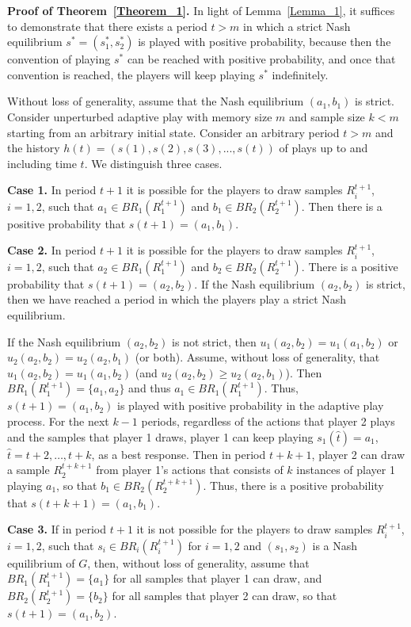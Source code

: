 \textbf{Proof of Theorem~\ref{Theorem_1}.}
In light of Lemma~\ref{Lemma_1}, it suffices to demonstrate that there exists a period $t > m$ in which a strict Nash equilibrium $s^*=(s_1^*,s_2^*)$ is played with positive probability, because then the convention of playing $s^*$ can be reached with positive probability, and once that convention is reached, the players will keep playing $s^*$ indefinitely.

Without loss of generality, assume that the Nash equilibrium $(a_1,b_1)$ is strict. 
%
Consider unperturbed adaptive play with memory size $m$ and sample size $k < m$ starting from an arbitrary initial state. Consider an arbitrary period $t>m$ and the history $h(t) = (s(1), s(2), s(3), ..., s(t))$ of plays up to and including time $t$. 
%
We distinguish three cases.

{\bf Case 1. } In period $t+1$ it is possible for the players to draw samples $R_i^{t+1}$, $i=1,2$, such that $a_1\in BR_1(R_1^{t+1})$ and $b_1\in BR_2(R_2^{t+1})$. Then there is a positive probability that $s(t+1)=(a_1,b_1)$. 

{\bf Case 2. } In period $t+1$ it is possible for the players to draw samples $R_i^{t+1}$, $i=1,2$, such that $a_2\in BR_1(R_1^{t+1})$ and $b_2\in BR_2(R_2^{t+1})$. There is a positive probability that $s(t+1)=(a_2,b_2)$. If the Nash equilibrium $(a_2,b_2)$ is strict, then we have reached a period in which the players play a strict Nash equilibrium.  
%

If the Nash equilibrium $(a_2,b_2)$ is not strict, then $u_1(a_2,b_2) = u_1(a_1,b_2)$ or $u_2(a_2,b_2) = u_2(a_2,b_1)$ (or both). Assume, without loss of generality, that $u_1(a_2,b_2) = u_1(a_1,b_2)$ (and $u_2(a_2,b_2) \geq u_2(a_2,b_1)$). Then $BR_1(R_1^{t+1})=\{a_1,a_2\}$ and thus $a_1\in BR_1(R_1^{t+1})$. Thus, $s(t+1)=(a_1,b_2)$ is played with positive probability in the adaptive play process. For the next $k-1$ periods, regardless of the actions that player 2 plays and the samples that player 1 draws, player 1 can keep playing $s_1(\hat{t})=a_1$, $\hat{t}=t+2, \ldots, t+k$, as a best response. Then in period $t+k+1$, player 2 can draw a sample $R_2^{t+k+1}$ from player 1's actions that consists of $k$ instances of player 1 playing $a_1$, so that $b_1\in BR_2(R_2^{t+k+1})$. Thus, there is a positive probability that $s(t+k+1)=(a_1,b_1)$. 

{\bf Case 3.} If in period $t+1$ it is not possible for the players to draw samples $R_i^{t+1}$, $i=1,2$, such that $s_i\in BR_i(R_i^{t+1})$ for $i=1,2$ and $(s_1,s_2)$ is a Nash equilibrium of $G$, then, without loss of generality, assume that $BR_1(R_1^{t+1})=\{a_1\}$ for all samples that player 1 can draw, and $BR_2(R_2^{t+1})=\{b_2\}$ for all samples that player 2 can draw, so that $s(t+1)=(a_1,b_2)$. 
%

